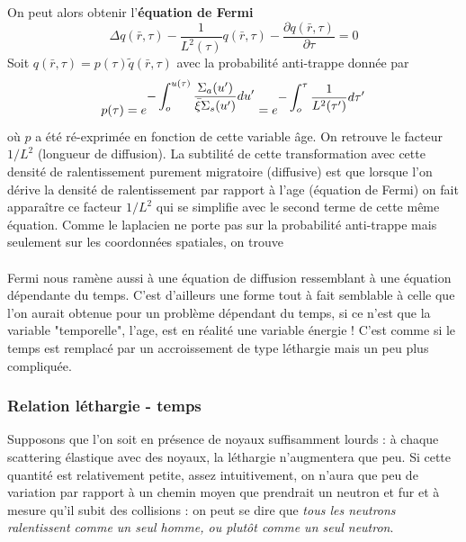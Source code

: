	On peut alors obtenir l'\textbf{équation de Fermi}
	\begin{equation}
	\Delta q(\bar r,\tau ) - \frac{1}{{{L^2}(\tau )}}q(\bar r,\tau ) - \frac{{\partial q(\bar r,\tau
	 )}}{{\partial \tau }} = 0
	\end{equation}
	Soit $q(\bar r,\tau ) = p(\tau )\tilde q(\bar r,\tau )$ avec la probabilité anti-trappe donnée 
	par
	\begin{equation}
	p(\tau ) = {e^{\displaystyle - \int_o^{u(\tau )}    \frac{{{\Sigma _a}(u')}}{{\bar \xi {\Sigma _s}(u')}}
	du'}} = {e^{\displaystyle - \int_o^\tau     \frac{1}{{{L^2}(\tau ')}}d\tau '}}
	\end{equation}
	où $p$ a été ré-exprimée en fonction de cette variable âge. On retrouve le facteur $1/L^2$ 
	(longueur de diffusion). La subtilité de cette  transformation avec cette densité de 
	ralentissement purement migratoire (diffusive) est que lorsque l'on dérive la densité de 
	ralentissement par rapport à l'age (équation de Fermi) on fait apparaître ce facteur 
	$1/L^2$ qui se simplifie avec le second terme de cette même équation. Comme le laplacien ne 
	porte pas sur la probabilité anti-trappe mais seulement sur les coordonnées spatiales, on 
	trouve\\
	
	\ \\
	
	Fermi nous ramène aussi à une équation de diffusion ressemblant à une équation dépendante du
	temps. 	C'est d'ailleurs une forme tout à fait semblable à celle que l'on aurait obtenue pour 
	un problème dépendant du temps, si ce n'est que la variable "temporelle", l'age, est en 
	réalité une variable énergie ! C'est comme si le temps est remplacé par un accroissement de 
	type léthargie mais un peu plus compliquée.
	
	\subsubsection{Relation léthargie - temps}
	Supposons que l'on soit en présence de noyaux suffisamment lourds : à chaque scattering élastique
	avec des noyaux, la léthargie n'augmentera que peu. Si cette quantité est relativement petite, 
	assez intuitivement, on n'aura que peu de variation par rapport à un chemin moyen que prendrait 
	un neutron et fur et à mesure qu'il subit des collisions : on peut se dire que \textit{tous les
	neutrons ralentissent comme un seul homme, ou plutôt comme un seul neutron}.\\
	
